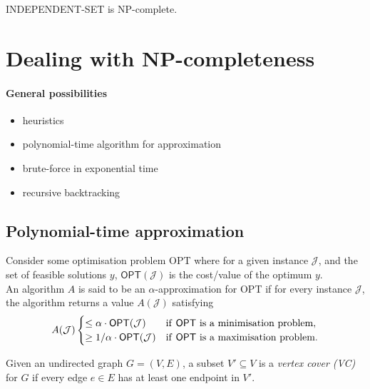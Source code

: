 \documentclass{article}
\begin{document}
\begin{proposition}
	INDEPENDENT-SET is NP-complete.
\end{proposition}


\section{Dealing with NP-completeness}


\paragraph{General possibilities}
\begin{itemize}
	\item heuristics
	\item polynomial-time algorithm for approximation
	\item brute-force in exponential time
	\item recursive backtracking
\end{itemize}

\subsection{Polynomial-time approximation}

\begin{definition}
	Consider some optimisation problem \textsf{OPT} where for a given 
	instance $\mathcal{J}$, and the set of feasible solutions $y$,
	$\textsf{OPT}(\mathcal{J})$ is the cost/value of the optimum $y$.\\
	An algorithm $A$ is said to be an $\alpha$-approximation for \textsf{OPT}
	if for every instance $\mathcal{J}$, the algorithm returns a value
	$A(\mathcal{J})$ satisfying
	\begin{align*}
		A(\mathcal{J}) \begin{cases}
			\leq \alpha \cdot \textsf{OPT}(\mathcal{J}) &\text{if \textsf{OPT} is a minimisation problem},\\
			\geq 1/\alpha \cdot \textsf{OPT}(\mathcal{J}) &\text{if \textsf{OPT} is a maximisation problem}.
		\end{cases}
	\end{align*}
\end{definition}

\begin{definition}
	Given an undirected graph $G=(V,E)$, a subset $V'\subseteq V$ is a
	\emph{vertex cover (VC)} for $G$ if every edge $e\in E$ has at least one
	endpoint in $V'$.
\end{definition}
\end{document}
